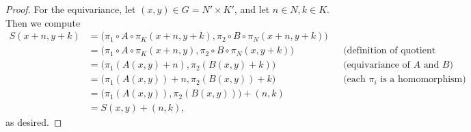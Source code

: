 \documentclass[12nt]{article}
\theoremstyle{plain}
\begin{document}
\begin{proof}
For the equivariance, let $(x, y) \in G = N' \times K'$, and let $n \in N, k \in K$. Then we compute
\begin{align*}
S(x + n, y + k) &= \Big(\pi_1 \circ A \circ \pi_K(x + n, y + k), \pi_2 \circ B \circ \pi_N(x + n, y + k) \Big) \\
	&= \Big(\pi_1 \circ A \circ \pi_K(x + n, y), \pi_2 \circ B \circ \pi_N(x, y + k) \Big) && \text{(definition of quotient maps)} \\
	&= \Big(\pi_1(A(x, y) + n), \pi_2(B(x, y) + k) \Big) && \text{(equivariance of $A$ and $B$)} \\
	&= \Big(\pi_1(A(x, y)) + n, \pi_2(B(x, y)) + k \Big) && \text{(each $\pi_i$ is a homomorphism)} \\
	&= \Big(\pi_1(A(x, y)), \pi_2(B(x, y)) \Big) + (n, k) \\
	&= S(x, y) + (n, k),
\end{align*}
as desired.

\end{proof}

{}

\end{document}
